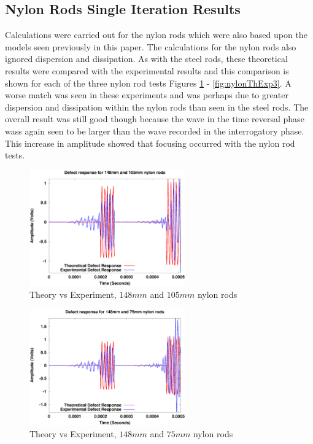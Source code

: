  \subsection{Nylon Rods Single Iteration Results}
 Calculations were carried out for the nylon rods which were also based upon the models seen previously in this paper. The calculations for the nylon rods also ignored dispersion and dissipation. As with the steel rods, these theoretical results were compared with the experimental results and this comparison is shown for each of the three nylon rod tests Figures \ref{fig:nylonThExp1} - \ref{fig:nylonThExp3}. A worse match was seen in these experiments and was perhaps due to greater dispersion and dissipation within the nylon rods than seen in the steel rods. The overall result was still good though because the wave in the time reversal phase wass again seen to be larger than the wave recorded in the interrogatory phase. This increase in amplitude showed that focusing occurred with the nylon rod tests. 
 
 \begin{figure}[ht!]
 \centering
 \includegraphics[width=0.6\textwidth]{eps_pics/nylon-2-3_Iter_th_exp.eps}
 \caption{Theory vs Experiment, $148 mm$ and $105 mm$ nylon rods
 	 \label{fig:nylonThExp1}} 
 \end{figure}
 
 \begin{figure}[ht!]
 \centering
 \includegraphics[width=0.6\textwidth]{eps_pics/nylon-2-4_Iter_th_exp.eps}
 \caption{Theory vs Experiment, $148 mm$ and $75 mm$ nylon rods
 	 \label{fig:nylonThExp2}} 
 \end{figure}
 
